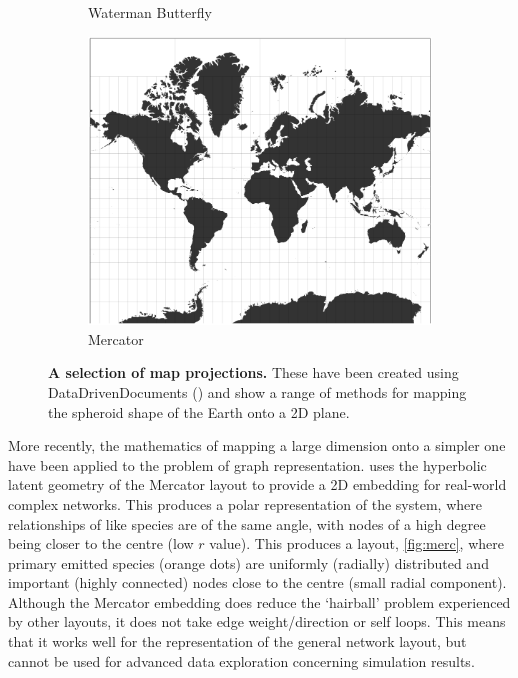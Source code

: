 \begin{figure}[H]
\begin{subfigure}[b]{.3\textwidth}
     \caption{Waterman Butterfly}
     \end{subfigure}
     \begin{subfigure}[b]{.3\textwidth}
         \centering
     \includegraphics[width=\textwidth]{figures_c1/layout/mercator.png}
     \caption{Mercator}
     \end{subfigure}
        \caption{\textbf{A selection of map projections.} These have been created using DataDrivenDocuments (\cite{d3}) and show a range of methods for mapping the spheroid shape of the Earth onto a 2D plane. }
      \label{fig:projections}
\end{figure}

More recently, the mathematics of mapping a large dimension onto a simpler one have been applied to the problem of graph representation. \cite{mercgraph} uses the hyperbolic latent geometry of the Mercator layout to provide a 2D embedding for real-world complex networks. This produces a polar representation of the system, where relationships of like species are of the same angle, with nodes of a high degree being closer to the centre (low $r$ value). This produces a layout, \autoref{fig:merc}, where primary emitted species (orange dots) are uniformly (radially) distributed and important (highly connected) nodes close to the centre (small radial component). Although the Mercator embedding does reduce the `hairball' problem experienced by other layouts, it does not take edge weight/direction or self loops. This means that it works well for the representation of the general network layout, but cannot be used for advanced data exploration concerning simulation results.  


